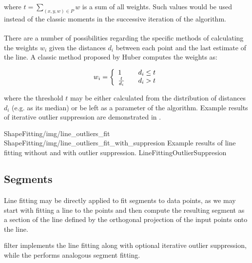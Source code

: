 where $t = \sum_{(x,y,w) \in P} w$ is a sum of all weights. Such values would be used instead of the classic moments in the successive iteration of the algorithm.

\paragraph*{}
There are a number of possibilities regarding the specific methods of calculating the weights $w_i$ given the distances $d_i$ between each point and the last estimate of the line. A classic method proposed by Huber computes the weights as:

\[
  w_i = \left\{ 
  \begin{array}{l l}
    1 & \quad d_i \leq t\\
    \frac{t}{d_i} & \quad d_i > t\\
  \end{array} \right.
\]

where the threshold $t$ may be either calculated from the distribution of distances $d_i$ (e.g. as its median) or be left as a parameter of the algorithm. Example results of iterative outlier suppression are demonstrated in .

\twoFigures
{ShapeFitting/img/line_outliers_fit}
{ShapeFitting/img/line_outliers_fit_with_suppresion}
{Example results of line fitting without and with outlier suppression.}
{LineFittingOutlierSuppresion}
{\basicWidth}

\subsection{Segments}

\paragraph*{}
Line fitting may be directly applied to fit segments to data points, as we may start with fitting a line to the points and then compute the resulting segment as a section of the line defined by the orthogonal projection of the input points onto the line.

\begin{refImpl}
\studio filter  implements the line fitting along with optional iterative outlier suppression, while the  performs analogous segment fitting.
\end{refImpl}